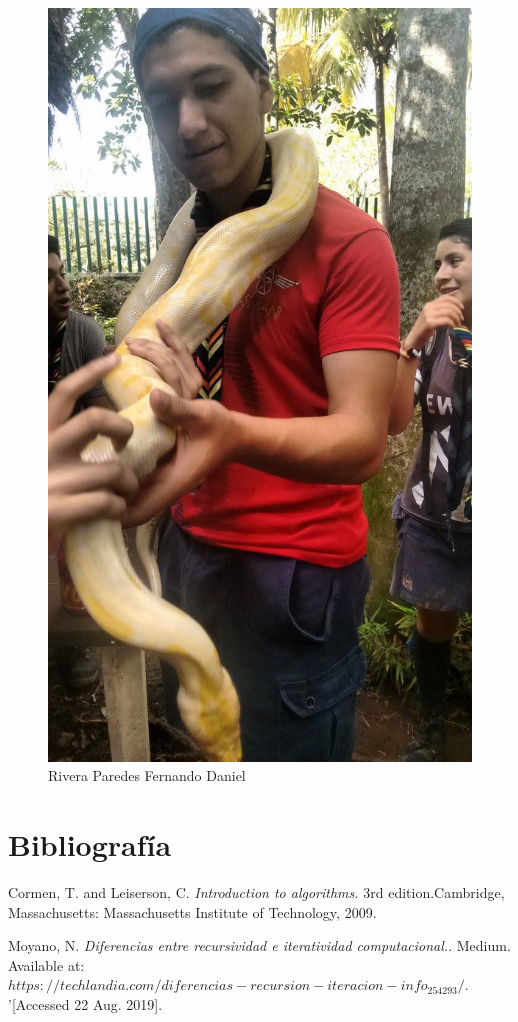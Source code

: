 \documentclass[12pt,twoside]{article}
\begin{document}
\begin{figure}[!h]
\begin{minipage}[t]{10cm}
		\includegraphics[scale=0.2]{Foto2}
		\caption{Rivera Paredes Fernando Daniel}
	\end{minipage}
\end{figure}

\section{Bibliograf\'ia}

\begin{thebibliography}{9}
  Cormen, T. and Leiserson, C.
  \textit{Introduction to algorithms.} 
  3rd edition.Cambridge, Massachusetts: Massachusetts Institute of Technology, 2009.

  Moyano, N.
  \textit{Diferencias entre recursividad e iteratividad computacional.}.
  Medium. Available at: $https://techlandia.com/diferencias-recursion-iteracion-info_254293/.$'[Accessed 22 Aug. 2019].
\end{thebibliography}
\end{document}

